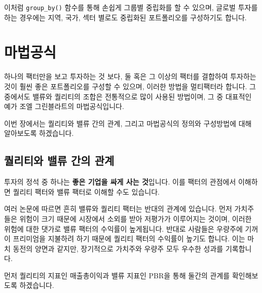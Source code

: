 \documentclass[12pt,]{book}
\begin{document}
이처럼 \texttt{group\_by()} 함수를 통해 손쉽게 그룹별 중립화를 할 수 있으며, 글로벌 투자를 하는 경우에는 지역, 국가, 섹터 별로도 중립화된 포트폴리오를 구성하기도 합니다.

\hypertarget{section-61}{%
\section{마법공식}\label{section-61}}

하나의 팩터만을 보고 투자하는 것 보다, 둘 혹은 그 이상의 팩터를 결합하여 투자하는 것이 훨씬 좋은 포트폴리오를 구성할 수 있으며, 이러한 방법을 멀티팩터라 합니다. 그중에서도 밸류와 퀄리티의 조합은 전통적으로 많이 사용된 방법이며, 그 중 대표적인 예가 조엘 그린블라트의 마법공식입니다.

이번 장에서는 퀄리티와 밸류 간의 관계, 그리고 마법공식의 정의와 구성방법에 대해 알아보도록 하겠습니다.

\hypertarget{section-62}{%
\subsection{퀄리티와 밸류 간의 관계}\label{section-62}}

투자의 정석 중 하나는 \textbf{좋은 기업을 싸게 사는 것}입니다. 이를 팩터의 관점에서 이해하면 퀄리티 팩터와 밸류 팩터로 이해할 수도 있습니다.

여러 논문에 따르면 흔히 밸류와 퀄리티 팩터는 반대의 관계에 있습니다. 먼저 가치주들은 위험이 크기 때문에 시장에서 소외를 받아 저평가가 이루어지는 것이며, 이러한 위험에 대한 댓가로 밸류 팩터의 수익률이 높게됩니다. 반대로 사람들은 우량주에 기꺼이 프리미엄을 지불하려 하기 때문에 퀄리티 팩터의 수익률이 높기도 합니다. 이는 마치 동전의 양면과 같지만, 장기적으로 가치주와 우량주 모두 우수한 성과를 기록합니다.

먼저 퀄리티의 지표인 매출총이익과 밸류 지표인 PBR을 통해 둘간의 관계를 확인해보도록 하겠습니다.
\end{document}

